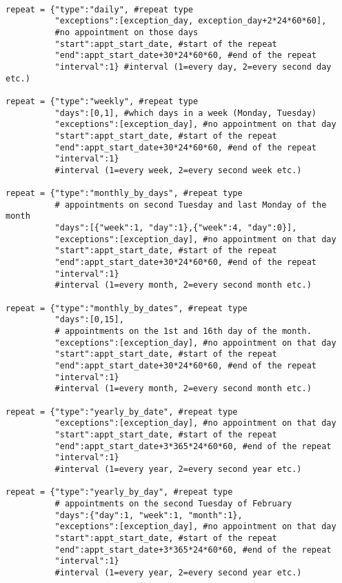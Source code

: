 \begin{verbatim}

repeat = {"type":"daily", #repeat type
          "exceptions":[exception_day, exception_day+2*24*60*60],  
          #no appointment on those days
          "start":appt_start_date, #start of the repeat
          "end":appt_start_date+30*24*60*60, #end of the repeat
          "interval":1} #interval (1=every day, 2=every second day etc.)

repeat = {"type":"weekly", #repeat type
          "days":[0,1], #which days in a week (Monday, Tuesday)
          "exceptions":[exception_day], #no appointment on that day
          "start":appt_start_date, #start of the repeat
          "end":appt_start_date+30*24*60*60, #end of the repeat
          "interval":1}  
          #interval (1=every week, 2=every second week etc.) 

repeat = {"type":"monthly_by_days", #repeat type
          # appointments on second Tuesday and last Monday of the month
          "days":[{"week":1, "day":1},{"week":4, "day":0}],
          "exceptions":[exception_day], #no appointment on that day 
          "start":appt_start_date, #start of the repeat
          "end":appt_start_date+30*24*60*60, #end of the repeat
          "interval":1}  
          #interval (1=every month, 2=every second month etc.)

repeat = {"type":"monthly_by_dates", #repeat type
          "days":[0,15],  
          # appointments on the 1st and 16th day of the month.
          "exceptions":[exception_day], #no appointment on that day
          "start":appt_start_date, #start of the repeat
          "end":appt_start_date+30*24*60*60, #end of the repeat
          "interval":1}  
          #interval (1=every month, 2=every second month etc.)

repeat = {"type":"yearly_by_date", #repeat type
          "exceptions":[exception_day], #no appointment on that day 
          "start":appt_start_date, #start of the repeat
          "end":appt_start_date+3*365*24*60*60, #end of the repeat
          "interval":1}  
          #interval (1=every year, 2=every second year etc.)

repeat = {"type":"yearly_by_day", #repeat type
          # appointments on the second Tuesday of February
          "days":{"day":1, "week":1, "month":1},
          "exceptions":[exception_day], #no appointment on that day 
          "start":appt_start_date, #start of the repeat
          "end":appt_start_date+3*365*24*60*60, #end of the repeat
          "interval":1}  
          #interval (1=every year, 2=every second year etc.)

\end{verbatim}
